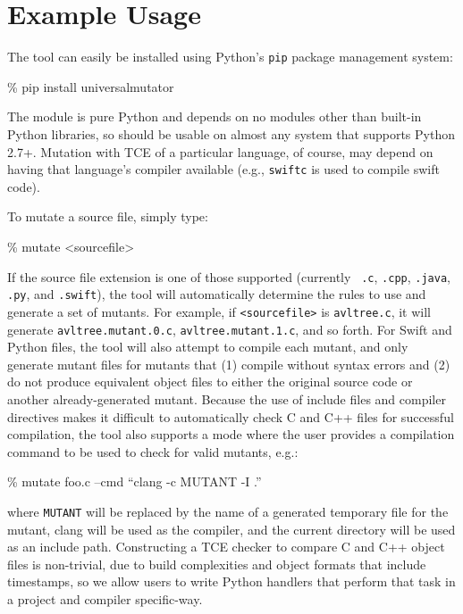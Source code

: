 \section{Example Usage}

The tool can easily be installed using Python's {\tt pip} package management system:

\begin{code}
\% pip install universalmutator
\end{code}

The module is pure Python and depends on no modules other than
built-in Python libraries, so should be usable on almost any system
that supports Python 2.7+.  Mutation with TCE of a particular
language, of course, may depend on having that language's compiler
available (e.g., {\tt swiftc} is used to compile swift code).

To mutate a source file, simply type:


\begin{code}
\% mutate <sourcefile>
\end{code}

If the source file extension is one of those supported (currently {\tt
  .c}, {\tt .cpp}, {\tt .java}, {\tt .py}, and {\tt .swift}), the tool
will automatically determine the rules to use and generate a set of
mutants.  For example, if {\tt <sourcefile>} is {\tt avltree.c}, it
will generate {\tt avltree.mutant.0.c}, {\tt avltree.mutant.1.c}, and
so forth.  For Swift and Python files, the tool will also attempt to
compile each mutant, and only generate mutant files for mutants that
(1) compile without syntax errors and (2) do not produce equivalent
object files to either the original source code or another
already-generated mutant.  Because the use of include files and
compiler directives makes it difficult to automatically check C and
C++ files
for successful compilation, the tool also supports a mode where the
user provides a compilation command to be used to check for valid
mutants, e.g.:


\begin{code}
\% mutate foo.c --cmd ``clang -c MUTANT -I .''
\end{code}

\noindent where {\tt MUTANT} will be replaced by the name of a
generated temporary file for the mutant, clang will be used as the
compiler, and the current directory will be used as an include path.  Constructing a TCE checker
to compare C and C++ object files is non-trivial, due to build
complexities and object formats that include timestamps, so we allow
users to write Python handlers that perform that task in a project and
compiler specific-way.

